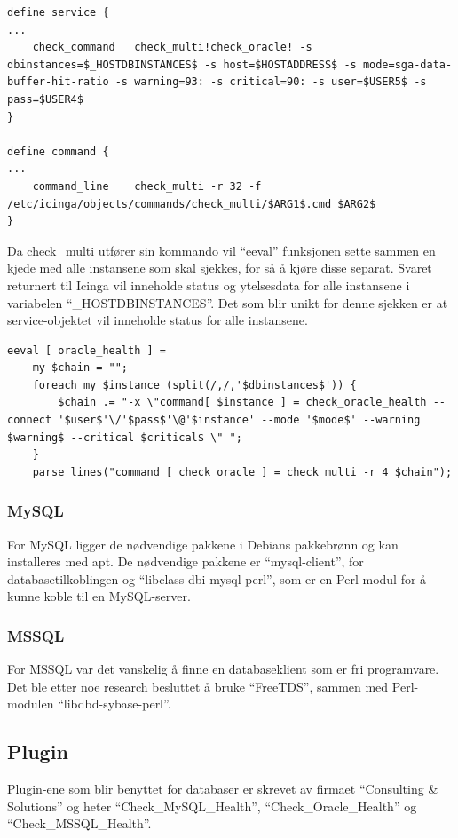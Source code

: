 \begin{lstlisting}[style=example]
define service {
...
    check_command	check_multi!check_oracle! -s dbinstances=$_HOSTDBINSTANCES$ -s host=$HOSTADDRESS$ -s mode=sga-data-buffer-hit-ratio -s warning=93: -s critical=90: -s user=$USER5$ -s pass=$USER4$
}

define command {
...
	command_line	check_multi -r 32 -f /etc/icinga/objects/commands/check_multi/$ARG1$.cmd $ARG2$
}
\end{lstlisting}
Da check\_multi utfører sin kommando vil ``eeval'' funksjonen sette sammen en kjede med alle instansene som skal sjekkes, for så å kjøre disse separat. Svaret returnert til Icinga vil inneholde status og ytelsesdata for alle instansene i variabelen ``\_HOSTDBINSTANCES''. Det som blir unikt for denne sjekken er at service-objektet vil inneholde status for alle instansene.
\begin{lstlisting}[style=example]
eeval [ oracle_health ] =
    my $chain = "";
    foreach my $instance (split(/,/,'$dbinstances$')) {
        $chain .= "-x \"command[ $instance ] = check_oracle_health --connect '$user$'\/'$pass$'\@'$instance' --mode '$mode$' --warning $warning$ --critical $critical$ \" ";
    }
    parse_lines("command [ check_oracle ] = check_multi -r 4 $chain");
\end{lstlisting}

\subsubsection{MySQL}
For MySQL ligger de nødvendige pakkene i Debians pakkebrønn og kan installeres med apt. De nødvendige pakkene er ``mysql-client'', for databasetilkoblingen og ``libclass-dbi-mysql-perl'', som er en Perl-modul for å kunne koble til en MySQL-server.

\subsubsection{MSSQL}
For MSSQL var det vanskelig å finne en databaseklient som er fri programvare. Det ble etter noe research besluttet å bruke ``FreeTDS''\cite{freetds}, sammen med Perl-modulen ``libdbd-sybase-perl''.

\subsection{Plugin}
Plugin-ene som blir benyttet for databaser er skrevet av firmaet ``Consulting \& Solutions'' og heter ``Check\_MySQL\_Health'', ``Check\_Oracle\_Health'' og ``Check\_MSSQL\_Health''\cite{consol}.

